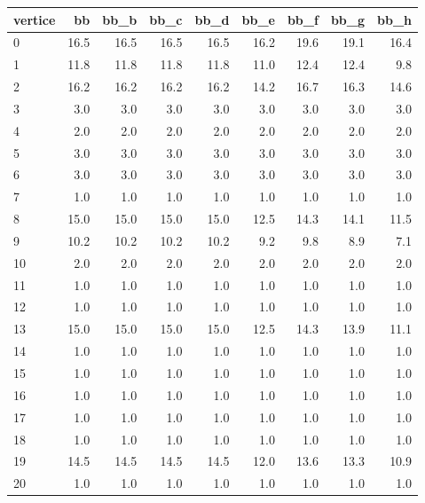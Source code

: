 \begin{tabular}{lrrrrrrrr}
\toprule
vertice &    bb &  bb\_b &  bb\_c &  bb\_d &  bb\_e &  bb\_f &  bb\_g &  bb\_h \\
\midrule
      0 &  16.5 &  16.5 &  16.5 &  16.5 &  16.2 &  19.6 &  19.1 &  16.4 \\
      1 &  11.8 &  11.8 &  11.8 &  11.8 &  11.0 &  12.4 &  12.4 &   9.8 \\
      2 &  16.2 &  16.2 &  16.2 &  16.2 &  14.2 &  16.7 &  16.3 &  14.6 \\
      3 &   3.0 &   3.0 &   3.0 &   3.0 &   3.0 &   3.0 &   3.0 &   3.0 \\
      4 &   2.0 &   2.0 &   2.0 &   2.0 &   2.0 &   2.0 &   2.0 &   2.0 \\
      5 &   3.0 &   3.0 &   3.0 &   3.0 &   3.0 &   3.0 &   3.0 &   3.0 \\
      6 &   3.0 &   3.0 &   3.0 &   3.0 &   3.0 &   3.0 &   3.0 &   3.0 \\
      7 &   1.0 &   1.0 &   1.0 &   1.0 &   1.0 &   1.0 &   1.0 &   1.0 \\
      8 &  15.0 &  15.0 &  15.0 &  15.0 &  12.5 &  14.3 &  14.1 &  11.5 \\
      9 &  10.2 &  10.2 &  10.2 &  10.2 &   9.2 &   9.8 &   8.9 &   7.1 \\
     10 &   2.0 &   2.0 &   2.0 &   2.0 &   2.0 &   2.0 &   2.0 &   2.0 \\
     11 &   1.0 &   1.0 &   1.0 &   1.0 &   1.0 &   1.0 &   1.0 &   1.0 \\
     12 &   1.0 &   1.0 &   1.0 &   1.0 &   1.0 &   1.0 &   1.0 &   1.0 \\
     13 &  15.0 &  15.0 &  15.0 &  15.0 &  12.5 &  14.3 &  13.9 &  11.1 \\
     14 &   1.0 &   1.0 &   1.0 &   1.0 &   1.0 &   1.0 &   1.0 &   1.0 \\
     15 &   1.0 &   1.0 &   1.0 &   1.0 &   1.0 &   1.0 &   1.0 &   1.0 \\
     16 &   1.0 &   1.0 &   1.0 &   1.0 &   1.0 &   1.0 &   1.0 &   1.0 \\
     17 &   1.0 &   1.0 &   1.0 &   1.0 &   1.0 &   1.0 &   1.0 &   1.0 \\
     18 &   1.0 &   1.0 &   1.0 &   1.0 &   1.0 &   1.0 &   1.0 &   1.0 \\
     19 &  14.5 &  14.5 &  14.5 &  14.5 &  12.0 &  13.6 &  13.3 &  10.9 \\
     20 &   1.0 &   1.0 &   1.0 &   1.0 &   1.0 &   1.0 &   1.0 &   1.0 \\

\end{tabular}
